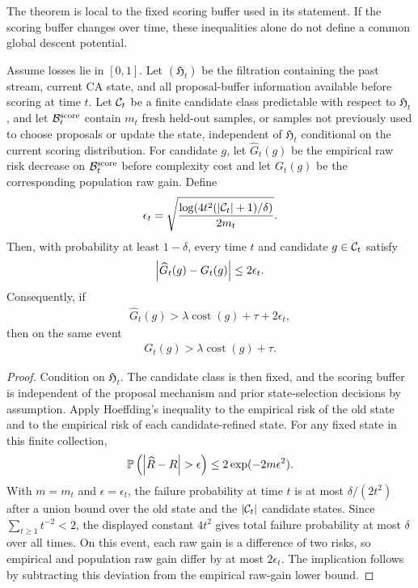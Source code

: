 The theorem is local to the fixed scoring buffer used in its statement. If the scoring buffer changes over time, these inequalities alone do not define a common global descent potential.

\begin{theorem}
\label{thm:safe-refinement:formal}
Assume losses lie in $[0,1]$. Let $(\mathfrak H_t)$ be the filtration containing the past stream, current CA state, and all proposal-buffer information available before scoring at time $t$. Let $\mathcal{C}_t$ be a finite candidate class predictable with respect to $\mathfrak H_t$, and let $\mathcal{B}_t^{\mathrm{score}}$ contain $m_t$ fresh held-out samples, or samples not previously used to choose proposals or update the state, independent of $\mathfrak H_t$ conditional on the current scoring distribution. For candidate $g$, let $\widehat G_t(g)$ be the empirical raw risk decrease on $\mathcal{B}_t^{\mathrm{score}}$ before complexity cost and let $G_t(g)$ be the corresponding population raw gain. Define
\begin{align*}
\epsilon_t=
\sqrt{
\frac{\log(4t^2(\left\lvert\mathcal{C}_t\right\rvert+1)/\delta)}
{2m_t}
}.
\end{align*}
Then, with probability at least $1-\delta$, every time $t$ and candidate $g\in\mathcal{C}_t$ satisfy
\begin{align*}
\left\lvert\widehat G_t(g)-G_t(g)\right\rvert
\le
2\epsilon_t.
\end{align*}
Consequently, if
\begin{align*}
\widehat G_t(g)>
\lambda\operatorname{cost}(g)+\tau+2\epsilon_t,
\end{align*}
then on the same event
\begin{align*}
G_t(g)>
\lambda\operatorname{cost}(g)+\tau.
\end{align*}
\end{theorem}
\begin{proof}
Condition on $\mathfrak H_t$. The candidate class is then fixed, and the scoring buffer is independent of the proposal mechanism and prior state-selection decisions by assumption. Apply Hoeffding's inequality to the empirical risk of the old state and to the empirical risk of each candidate-refined state. For any fixed state in this finite collection,
\begin{align*}
\mathbb P\left(\left\lvert\widehat R-R\right\rvert>\epsilon\right)
\le 2\exp(-2m\epsilon^2).
\end{align*}
With $m=m_t$ and $\epsilon=\epsilon_t$, the failure probability at time $t$ is at most $\delta/(2t^2)$ after a union bound over the old state and the $\left\lvert\mathcal{C}_t\right\rvert$ candidate states. Since $\sum_{t\ge1}t^{-2}<2$, the displayed constant $4t^2$ gives total failure probability at most $\delta$ over all times. On this event, each raw gain is a difference of two risks, so empirical and population raw gain differ by at most $2\epsilon_t$. The implication follows by subtracting this deviation from the empirical raw-gain lower bound.
\end{proof}

